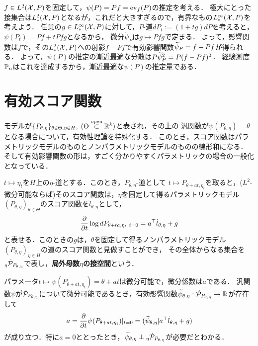 \documentclass[uplatex,dvipdfmx]{jsreport}
\begin{document}
\begin{example}[経験測度]
    $f\in L^2(\X,P)$を固定して，$\psi(P)=Pf=\ev_f(P)$の推定を考える．
    極大にとった接集合は$L^2_*(\X,P)$となるが，これだと大きすぎるので，有界なもの$L^\infty_*(\X,P)$を考えよう．
    任意の$g\in L^\infty_*(\X,P)$に対して，$P$-道$dP_t:=(1+tg)dP$を考えると，$\psi(P_t)=Pf+tPfg$となるから，
    微分$\dot{\psi}_P$は$g\mapsto Pfg$で定まる．
    よって，影響関数は$f$で，その$L^2_*(\X,P)$への射影$f-Pf$で有効影響関数$\wt{\psi}_P=f-Pf$が得られる．
    よって，$\psi(P)$の推定の漸近最適な分散は$P\wt{\psi}_P^2=P(f-Pf)^2$．
    経験測度$\bP_n$はこれを達成するから，漸近最適な$\psi(P)$の推定量である．
\end{example}

\section{有効スコア関数}

\begin{tcolorbox}[colframe=ForestGreen, colback=ForestGreen!10!white,breakable,colbacktitle=ForestGreen!40!white,coltitle=black,fonttitle=\bfseries\sffamily,
title=]
    モデルが$\{P_{\theta,\eta}\}_{\theta\in\Theta,\eta\in H},\;(\Theta\osub\R^k)$と表され，その上の
    汎関数が$\psi(P_{\theta,\eta})=\theta$となる場合について，有効性理論を特殊化する．
    このとき，スコア関数はパラメトリックモデルのものとノンパラメトリックモデルのものの線形和になる．
    そして有効影響関数の形は，すごく分かりやすくパラメトリックの場合の一般化となっている．
\end{tcolorbox}

\begin{discussion}[局外母数の接空間]
    $t\mapsto\eta_t$を$H$上の$\eta$-道とする．このとき，$P_{\theta,\eta}$-道として
    $t\mapsto P_{\theta+at,\eta_t}$を取ると，($L^2$-微分可能ならば)そのスコア関数は，$\eta$を固定して得るパラメトリックモデル$(P_{\theta,\eta})_{\theta\in\Theta}$のスコア関数を$\dot{l}_{\theta,\eta}$として，
    \[\pp{}{t}\log dP_{\theta+ta,\eta_t}|_{t=0}=a^\top\dot{l}_{\theta,\eta}+g\]
    と表せる．このときの$g$は，$\theta$を固定して得るノンパラメトリックモデル$(P_{\theta,\eta})_{\eta\in H}$の道のスコア関数と見做すことができ，
    その全体からなる集合を${}_\eta\dot{\P}_{P_{\theta,\eta}}$で表し，\textbf{局外母数$\eta$の接空間}という．
\end{discussion}

\begin{discussion}
    パラメータ$t\mapsto\psi(P_{\theta+at,\eta_t})=\theta+at$は微分可能で，微分係数は$a$である．
    汎関数$\psi$が$\dot{\P}_{P_{\theta,\eta}}$について微分可能であるとき，有効影響関数$\wt{\psi}_{\theta,\eta}:\dot{\P}_{P_{\theta,\eta}}\to\R$が存在して
    \[a=\pp{}{t}\psi(P_{\theta+at,\eta_t})|_{t=0}=(\wt{\psi}_{\theta,\eta}|a^\top\dot{l}_{\theta,\eta}+g)\]
    が成り立つ．特に$a=0$ととったとき，$\wt{\psi}_{\theta,\eta}\perp{}_\eta\dot{\P}_{P_{\theta,\eta}}$が必要だとわかる．
\end{discussion}
\end{document}

